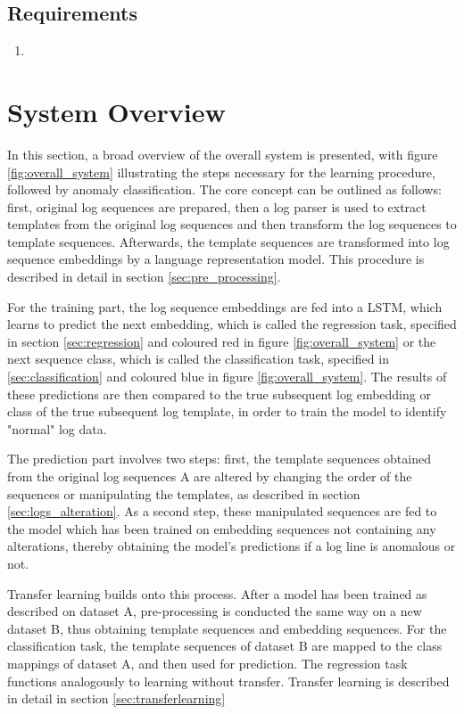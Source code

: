 \subsection{Requirements}
\begin{enumerate}
	\item 
\end{enumerate}



\section{System Overview \label{sec:overall_system}}
In this section, a broad overview of the overall system is presented, with figure \ref{fig:overall_system} illustrating the steps necessary for the learning procedure, followed by anomaly classification. 
The core concept can be outlined as follows: first, original log sequences are prepared, then a log parser is used to extract templates from the original log sequences and then transform the log sequences to template sequences. Afterwards, the template sequences are transformed into log sequence embeddings by a language representation model. This procedure is described in detail in section \ref{sec:pre_processing}. 

For the training part, the log sequence embeddings are fed into a LSTM, which learns to predict the next embedding, which is called the regression task, specified in section \ref{sec:regression} and coloured red in figure \ref{fig:overall_system} or the next sequence class, which is called the classification task, specified in \ref{sec:classification} and coloured blue in figure \ref{fig:overall_system}. The results of these predictions are then compared to the true subsequent log embedding or class of the true subsequent log template, in order to train the model to identify "normal" log data.

The prediction part involves two steps: first, the template sequences obtained from the original log sequences A are altered by changing the order of the sequences or manipulating the templates, as described in section \ref{sec:logs_alteration}. As a second step, these manipulated sequences are fed to the model which has been trained on embedding sequences not containing any alterations, thereby obtaining the model's predictions if a log line is anomalous or not.

Transfer learning builds onto this process. After a model has been trained as described on dataset A, pre-processing is conducted the same way on a new dataset B, thus obtaining template sequences and embedding sequences. For the classification task, the template sequences of dataset B are mapped to the class mappings of dataset A, and then used for prediction. The regression task functions analogously to learning without transfer. Transfer learning is described in detail in section \ref{sec:transferlearning}

